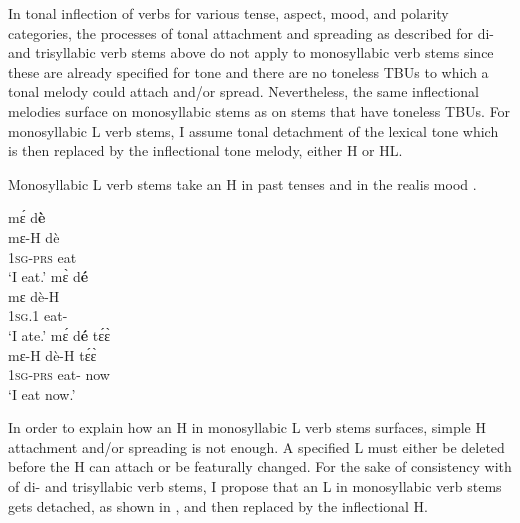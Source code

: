 In tonal inflection of verbs for various tense, aspect, mood, and polarity categories, the processes of tonal attachment and spreading as described for di- and trisyllabic verb stems above do not apply to monosyllabic verb stems since these are already specified for tone and there are no toneless TBUs to which a tonal melody could attach and/or spread. Nevertheless, the same inflectional melodies surface on monosyllabic stems as on stems that have toneless TBUs. For monosyllabic L verb stems, I assume tonal detachment of the lexical tone which is then replaced by the inflectional tone melody, either H or HL.
 
Monosyllabic L verb stems take an H in past tenses   and in the realis mood .


\ea\label{Detachde}
  \ea \label{Detachde1}
  \glll     mɛ́ d{\bfseries è} \\
	mɛ-H dè \\	
            1\textsc{sg}-\textsc{prs} eat     \\
    \trans `I eat.'
\ex\label{Detachde2}
  \glll    mɛ̀ d{\bfseries é} \\
	mɛ dè-H \\	
            1\textsc{sg}.{\PST}1 eat-{\PST}     \\
    \trans `I ate.'
\ex\label{Detachde3} 
  \glll     mɛ́ d{\bfseries é} tɛ́ɛ̀ \\
	mɛ-H dè-H tɛ́ɛ̀ \\	
            1\textsc{sg}-\textsc{prs} eat-{\R} now     \\
    \trans `I eat now.'
\z
\z

In order to explain how an H in monosyllabic L verb stems surfaces, simple H attachment and/or spreading is not enough. A specified L must either be deleted before the H can attach or be featurally changed. For the sake of consistency with {\HTS} of di- and trisyllabic verb stems, I propose that an L in monosyllabic verb stems gets detached, as shown in , and then replaced by the inflectional H.





